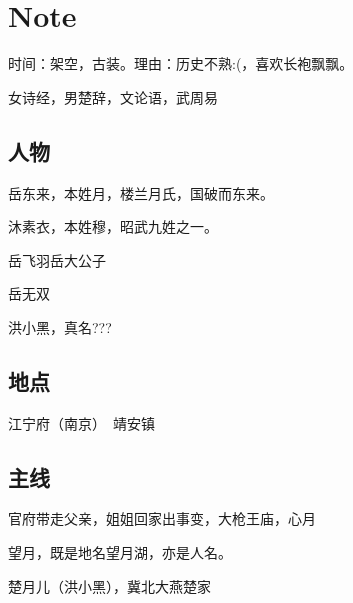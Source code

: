 
\chapter{Note}
\label{note}

时间：架空，古装。理由：历史不熟:(，喜欢长袍飘飘。

女诗经，男楚辞，文论语，武周易

\section{人物}
\label{sec:characters}


岳东来，本姓月，楼兰月氏，国破而东来。

沐素衣，本姓穆，昭武九姓之一。

岳飞羽岳大公子

岳无双

洪小黑，真名???

\section{地点}
\label{sec:place}

江宁府（南京）　靖安镇

\section{主线}
\label{sec:main-story}

官府带走父亲，姐姐回家出事变，大枪王庙，心月



望月，既是地名望月湖，亦是人名。

楚月儿（洪小黑），冀北大燕楚家